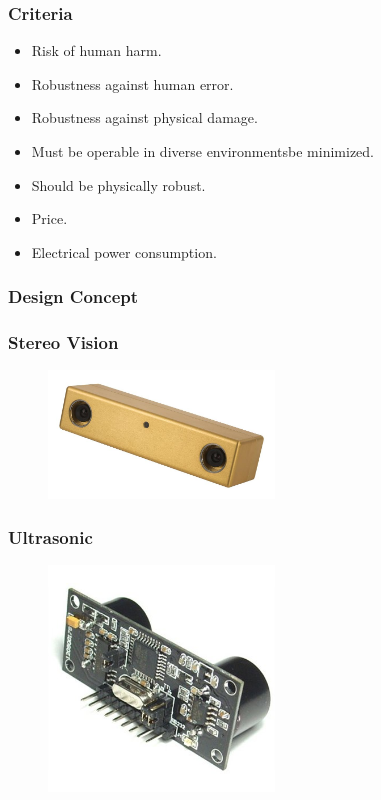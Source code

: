 \documentclass{beamer}
\begin{document}
\begin{frame}
  \frametitle{Criteria}
  \begin{itemize}
    \item Risk of human harm.\\
    \item Robustness against human error.\\
    \item Robustness against physical damage.\\
    \item Must be operable in diverse environmentsbe minimized. \\
    \item Should be physically robust. \\
    \item Price.\\
    \item Electrical power consumption.\\
  \end{itemize}
\end{frame}

\begin{frame}
  \frametitle{Design Concept}
\end{frame}

\begin{frame}
  \frametitle{Stereo Vision}
  \begin{figure}
    \centering
    \includegraphics[width=6cm]{stereovision.jpg}
  \end{figure}
\end{frame}

\begin{frame}
  \frametitle{Ultrasonic}
  \begin{figure}
    \centering
    \includegraphics[width=6cm]{ultrasonic.jpg}
  \end{figure}
\end{frame}
\end{document}
